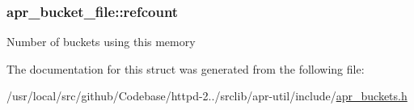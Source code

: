 \subsubsection[{\texorpdfstring{refcount}{refcount}}]{ apr\+\_\+bucket\+\_\+file\+::refcount}\hypertarget{structapr__bucket__file_ab0c123f34b85a07b601dc9794f8eed09}{}\label{structapr__bucket__file_ab0c123f34b85a07b601dc9794f8eed09}
Number of buckets using this memory 

The documentation for this struct was generated from the following file\+:\begin{DoxyCompactItemize}
\item 
/usr/local/src/github/\+Codebase/httpd-\/2../srclib/apr-\/util/include/\hyperlink{apr__buckets_8h}{apr\+\_\+buckets.\+h}\end{DoxyCompactItemize}
